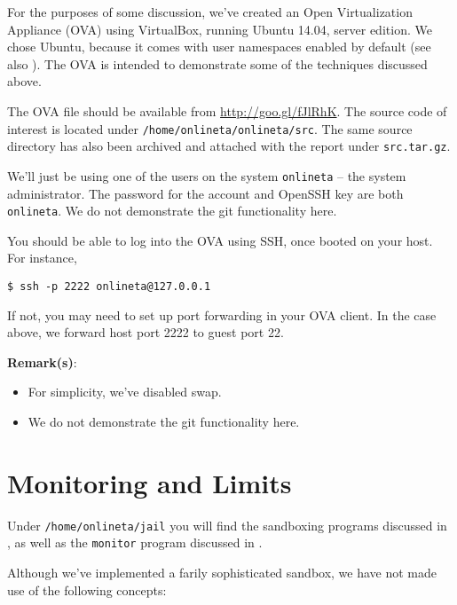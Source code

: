 For the purposes of some discussion, we've created an Open Virtualization
Appliance (OVA) using VirtualBox, running Ubuntu 14.04, server edition. We
chose Ubuntu, because it comes with user namespaces enabled by default (see
also ). The OVA is intended to
demonstrate some of the techniques discussed above.

The OVA file should be available from \url{http://goo.gl/fJlRhK}. The source
code of interest is located under \texttt{/home/onlineta/onlineta/src}. The
same source directory has also been archived and attached with the report under
\texttt{src.tar.gz}.

We'll just be using one of the users on the system \texttt{onlineta} -- the
system administrator. The password for the account and OpenSSH key are both
\texttt{onlineta}. We do not demonstrate the git functionality here.

You should be able to log into the OVA using SSH, once booted on your host.
For instance,

\begin{lstlisting}
$ ssh -p 2222 onlineta@127.0.0.1
\end{lstlisting}

If not, you may need to set up port forwarding in your OVA client. In the case
above, we forward host port 2222 to guest port 22.

\textbf{Remark(s)}:

\begin{itemize}

\item For simplicity, we've disabled swap.

\item We do not demonstrate the git functionality here.

\end{itemize}

\section{Monitoring and Limits}

Under \texttt{/home/onlineta/jail} you will find the sandboxing programs
discussed in , as well
as the \texttt{monitor} program discussed in
.

Although we've implemented a farily sophisticated sandbox, we have not made use
of the following concepts:

